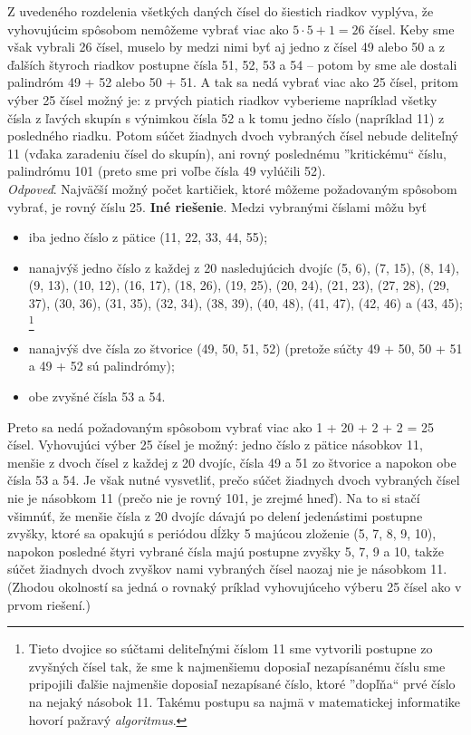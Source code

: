 {Z uvedeného rozdelenia všetkých daných čísel do šiestich riadkov vyplýva, že vyhovujúcim spôsobom nemôžeme vybrať viac ako $5 \cdot 5 + 1 = 26$ čísel. Keby sme však vybrali 26 čísel, muselo by medzi nimi byť aj jedno z čísel 49 alebo 50 a z ďalších štyroch riadkov postupne čísla 51, 52, 53 a 54 -- potom by sme ale dostali palindróm 49 + 52 alebo 50 + 51. A tak sa nedá vybrať viac ako 25 čísel, pritom výber 25 čísel možný je: z prvých piatich riadkov vyberieme napríklad všetky čísla z ľavých skupín s výnimkou čísla 52 a k tomu jedno číslo (napríklad 11) z posledného riadku. Potom súčet žiadnych dvoch vybraných čísel nebude deliteľný 11 (vďaka zaradeniu čísel do skupín), ani rovný poslednému ”kritickému“ číslu, palindrómu 101 (preto sme pri voľbe čísla 49 vylúčili 52).\\
\textit{Odpoveď}. Najväčší možný počet kartičiek, ktoré môžeme požadovaným spôsobom vybrať, je rovný číslu 25.
\textbf{Iné riešenie}. Medzi vybranými číslami môžu byť
\begin{itemize}
\item iba jedno číslo z pätice (11, 22, 33, 44, 55);
\item nanajvýš jedno číslo z každej z 20 nasledujúcich dvojíc (5, 6), (7, 15), (8, 14), (9, 13), (10, 12), (16, 17), (18, 26), (19, 25), (20, 24), (21, 23), (27, 28), (29, 37), (30, 36), (31, 35), (32, 34), (38, 39), (40, 48), (41, 47), (42, 46) a (43, 45); \footnote{Tieto dvojice so súčtami deliteľnými číslom 11 sme vytvorili postupne zo zvyšných čísel tak, že sme k najmenšiemu doposiaľ nezapísanému číslu sme pripojili ďalšie najmenšie doposiaľ nezapísané číslo, ktoré ”dopľňa“ prvé číslo na nejaký násobok 11. Takému postupu sa najmä v matematickej
informatike hovorí pažravý \textit{algoritmus}.}
\item nanajvýš dve čísla zo štvorice (49, 50, 51, 52) (pretože súčty 49 + 50, 50 + 51 a 49 + 52 sú palindrómy);
\item obe zvyšné čísla 53 a 54.
\end{itemize}

Preto sa nedá požadovaným spôsobom vybrať viac ako 1 + 20 + 2 + 2 = 25 čísel. Vyhovujúci výber 25 čísel je možný: jedno číslo z pätice násobkov 11, menšie z dvoch čísel z každej z 20 dvojíc, čísla 49 a 51 zo štvorice a napokon obe čísla 53 a 54. Je však nutné vysvetliť, prečo súčet žiadnych dvoch vybraných čísel nie je násobkom 11 (prečo nie je rovný 101, je zrejmé hneď). Na to si stačí všimnúť, že menšie čísla z 20 dvojíc dávajú po delení jedenástimi postupne zvyšky, ktoré sa opakujú s periódou dĺžky 5 majúcou zloženie (5, 7, 8, 9, 10), napokon posledné štyri vybrané čísla majú postupne zvyšky 5, 7, 9 a 10, takže súčet žiadnych dvoch zvyškov nami vybraných čísel naozaj nie je násobkom 11. (Zhodou okolností sa jedná o rovnaký príklad vyhovujúceho výberu 25 čísel ako v prvom riešení.)
}